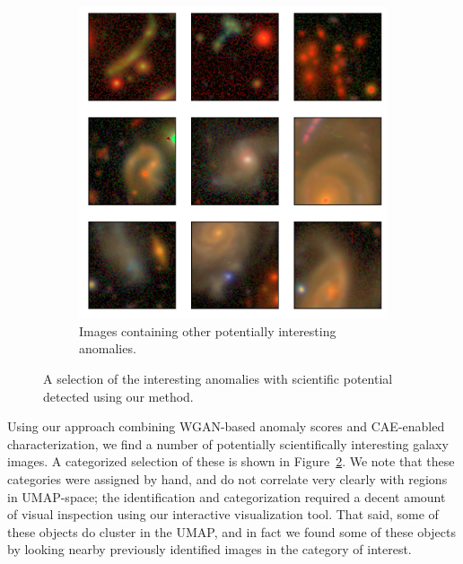 \begin{figure}
\vspace{1em}

\begin{subfigure}{.45\textwidth}
  \centering
  \includegraphics[width=0.8\linewidth]{anomalies_other}
  \caption{Images containing other potentially interesting anomalies.}
  \label{fig:anom_other}
\end{subfigure}
\vspace{0cm}
\caption{A selection of the interesting anomalies with scientific potential detected using our method.}
\label{fig:anomalies}
\end{figure}

Using our approach combining WGAN-based anomaly scores and CAE-enabled characterization, we find a number of potentially scientifically interesting galaxy images.
A categorized selection of these is shown in Figure~\ref{fig:anomalies}.
We note that these categories were assigned by hand, and do not correlate very clearly with regions in UMAP-space; the identification and categorization required a decent amount of visual inspection using our interactive visualization tool.
That said, some of these objects do cluster in the UMAP, and in fact we found some of these objects by looking nearby previously identified images in the category of interest.

